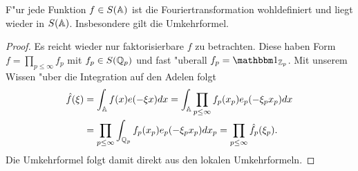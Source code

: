 	\begin{satz}
		F"ur jede Funktion $f\in S(\mathbb{A})$ ist die Fouriertransformation wohldefiniert und liegt wieder in $S(\mathbb{A})$.
		Insbesondere gilt die Umkehrformel.
	\end{satz}
	\begin{proof}
		Es reicht wieder nur faktorisierbare $f$ zu betrachten. 
		Diese haben Form $f = \prod_{p\leq \infty} f_p$ mit $f_p \in S({\mathbb{Q}_p})$ und fast "uberall $f_p = \ind_{\Zp}$.
		Mit unserem Wissen "uber die Integration auf den Adelen folgt
		\begin{align*}
			\hat{f} (\xi) 	&= \int_{\mathbb{A}} f(x)e(-\xi x)  d{x}
							= \int_{\mathbb{A}} \prod_{p\leq \infty} f_p(x_p) e_p(-\xi_p x_p) d{x} \\
							&= \prod_{p\leq \infty} \int_{{\mathbb{Q}_p}}  f_p(x_p) e_p(-\xi_p x_p) d{x}_p
							= \prod_{p\leq \infty} \hat{f}_p (\xi_p).
		\end{align*}
		Die Umkehrformel folgt damit direkt aus den lokalen Umkehrformeln.
	\end{proof}
	
	
